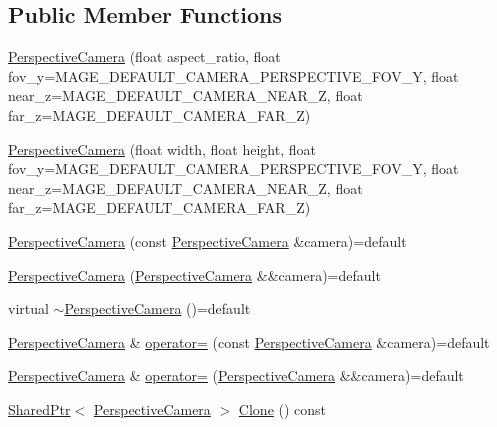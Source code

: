 \subsection*{Public Member Functions}
\begin{DoxyCompactItemize}
\item 
\hyperlink{classmage_1_1_perspective_camera_a118a233aa484bbff31032703087a5a8c}{Perspective\+Camera} (float aspect\+\_\+ratio, float fov\+\_\+y=M\+A\+G\+E\+\_\+\+D\+E\+F\+A\+U\+L\+T\+\_\+\+C\+A\+M\+E\+R\+A\+\_\+\+P\+E\+R\+S\+P\+E\+C\+T\+I\+V\+E\+\_\+\+F\+O\+V\+\_\+Y, float near\+\_\+z=M\+A\+G\+E\+\_\+\+D\+E\+F\+A\+U\+L\+T\+\_\+\+C\+A\+M\+E\+R\+A\+\_\+\+N\+E\+A\+R\+\_\+Z, float far\+\_\+z=M\+A\+G\+E\+\_\+\+D\+E\+F\+A\+U\+L\+T\+\_\+\+C\+A\+M\+E\+R\+A\+\_\+\+F\+A\+R\+\_\+Z)
\item 
\hyperlink{classmage_1_1_perspective_camera_af04c3995faa777606a1cd610acad43c0}{Perspective\+Camera} (float width, float height, float fov\+\_\+y=M\+A\+G\+E\+\_\+\+D\+E\+F\+A\+U\+L\+T\+\_\+\+C\+A\+M\+E\+R\+A\+\_\+\+P\+E\+R\+S\+P\+E\+C\+T\+I\+V\+E\+\_\+\+F\+O\+V\+\_\+Y, float near\+\_\+z=M\+A\+G\+E\+\_\+\+D\+E\+F\+A\+U\+L\+T\+\_\+\+C\+A\+M\+E\+R\+A\+\_\+\+N\+E\+A\+R\+\_\+Z, float far\+\_\+z=M\+A\+G\+E\+\_\+\+D\+E\+F\+A\+U\+L\+T\+\_\+\+C\+A\+M\+E\+R\+A\+\_\+\+F\+A\+R\+\_\+Z)
\item 
\hyperlink{classmage_1_1_perspective_camera_a03b3fd3c015012dcc4a9fa44e325d8be}{Perspective\+Camera} (const \hyperlink{classmage_1_1_perspective_camera}{Perspective\+Camera} \&camera)=default
\item 
\hyperlink{classmage_1_1_perspective_camera_a5fe4660f82f2dcd0179d6a6677be74b0}{Perspective\+Camera} (\hyperlink{classmage_1_1_perspective_camera}{Perspective\+Camera} \&\&camera)=default
\item 
virtual \hyperlink{classmage_1_1_perspective_camera_a119a77c3f14072040231845e9a894af2}{$\sim$\+Perspective\+Camera} ()=default
\item 
\hyperlink{classmage_1_1_perspective_camera}{Perspective\+Camera} \& \hyperlink{classmage_1_1_perspective_camera_a8c0189ff4f12ebe7108450a9a57ac07c}{operator=} (const \hyperlink{classmage_1_1_perspective_camera}{Perspective\+Camera} \&camera)=default
\item 
\hyperlink{classmage_1_1_perspective_camera}{Perspective\+Camera} \& \hyperlink{classmage_1_1_perspective_camera_af2be66beb3029aa644f3f38461b318af}{operator=} (\hyperlink{classmage_1_1_perspective_camera}{Perspective\+Camera} \&\&camera)=default
\item 
\hyperlink{namespacemage_a1e01ae66713838a7a67d30e44c67703e}{Shared\+Ptr}$<$ \hyperlink{classmage_1_1_perspective_camera}{Perspective\+Camera} $>$ \hyperlink{classmage_1_1_perspective_camera_ab660d9ee76631d7758662aa1a163acfe}{Clone} () const

\end{DoxyCompactItemize}
